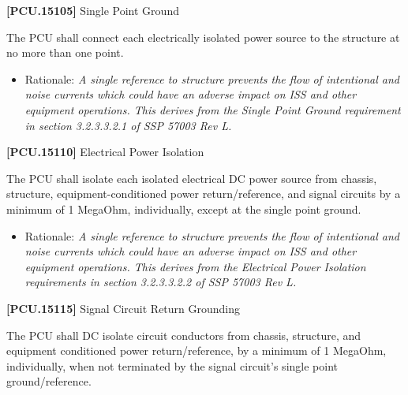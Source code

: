 \documentclass[12pt,oneside,oldfontcommands]{memoir}
\begin{document}
\textbf{[PCU.15105]} Single Point Ground

The \gls{PCU} shall connect each electrically isolated power source to the structure at no more than one point.

\begin{itemize}
\item{} Rationale: \emph{A single reference to structure prevents the flow of intentional and noise currents which could have an adverse impact on ISS and other equipment operations. This derives from the Single Point Ground requirement in section 3.2.3.3.2.1 of SSP 57003 Rev L.}

\end{itemize}

\textbf{[PCU.15110]} Electrical Power Isolation

The \gls{PCU} shall isolate each isolated electrical DC power source from chassis, structure, equipment-conditioned power return\slash reference, and signal circuits by a minimum of 1 MegaOhm, individually, except at the single point ground.

\begin{itemize}
\item{} Rationale: \emph{A single reference to structure prevents the flow of intentional and noise currents which could have an adverse impact on ISS and other equipment operations. This derives from the Electrical Power Isolation requirements in section 3.2.3.3.2.2 of SSP 57003 Rev L.}

\end{itemize}

\textbf{[PCU.15115]} Signal Circuit Return Grounding

The \gls{PCU} shall DC isolate circuit conductors from chassis, structure, and equipment conditioned power return\slash reference, by a minimum of 1 MegaOhm, individually, when not terminated by the signal circuit's single point ground\slash reference.
\end{document}
